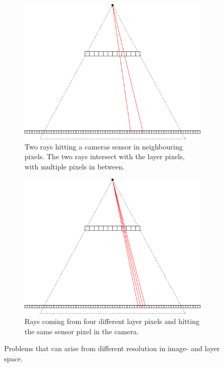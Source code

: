 \documentclass[11pt,a4paper,titlepage]{article}
\begin{document}
\begin{figure}[t]
	\centering
	\begin{subfigure}[t]{0.4\textwidth}
 		\includegraphics[scale=0.3]{sketches/problem_camera_to_layers.png} 
		\caption{Two rays hitting a cameras sensor in neighbouring pixels. The two rays intersect with the layer pixels, with multiple pixels in between.}
		\label{fig:problem_camera_to_layers}
	\end{subfigure}%
	\qquad
	\begin{subfigure}[t]{0.4\textwidth}
		\includegraphics[scale=0.3]{sketches/problem_layers_to_camera_rounding.png}
		\caption{Rays coming from four different layer pixels and hitting the same sensor pixel in the camera.}
		\label{fig:problem_layers_to_camera}
	\end{subfigure}
	\caption{Problems that can arise from different resolution in image- and layer space.}
\end{figure}
\end{document}
